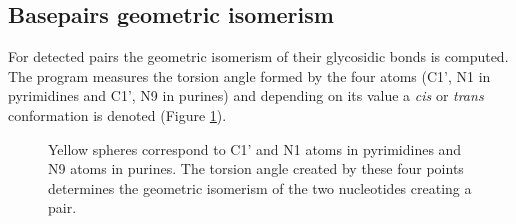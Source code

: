 \documentclass[12pt]{article}
\begin{document}
\subsection{Basepairs geometric isomerism}
For detected pairs the geometric isomerism of their glycosidic bonds is computed. The program measures the torsion angle formed by the four atoms (C1', N1 in pyrimidines and C1', N9 in purines) and depending on its value a {\it cis} or {\it trans} conformation is denoted (Figure \ref{Conf}).

\begin{figure}[h!]
\begin{center}
\end{center}
\caption{Yellow spheres correspond to C1' and N1 atoms in pyrimidines and N9 atoms in purines. The torsion angle created by these four points determines the geometric isomerism of the two nucleotides creating a pair. }
\label{Conf}
\end{figure}

\end{document}
